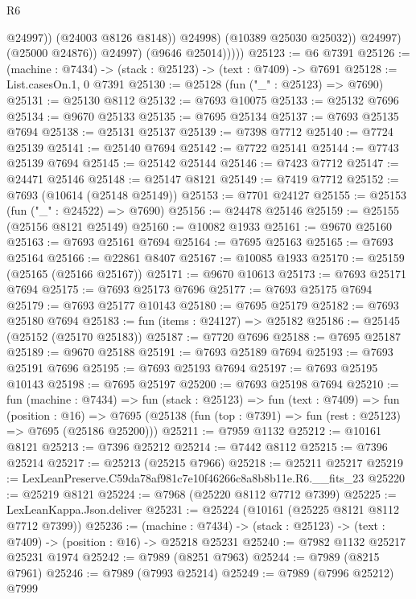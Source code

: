 \begin{lexlean}{R6}
\begin{coremodule}
                            @24997))
                        (@24003 @8126 @8148))
                      @24998)
                    (@10389 @25030 @25032))
                  @24997)
                (@25000 @24876))
              @24997)
            (@9646 @25014)))))
@25123 := @6 @7391
@25126 := (machine : @7434) -> (stack : @25123) -> (text : @7409) -> @7691
@25128 := List.casesOn.{1, 0} @7391
@25130 := @25128 (fun ("_" : @25123) => @7690)
@25131 := @25130 @8112
@25132 := @7693 @10075
@25133 := @25132 @7696
@25134 := @9670 @25133
@25135 := @7695 @25134
@25137 := @7693 @25135 @7694
@25138 := @25131 @25137
@25139 := @7398 @7712
@25140 := @7724 @25139
@25141 := @25140 @7694
@25142 := @7722 @25141
@25144 := @7743 @25139 @7694
@25145 := @25142 @25144
@25146 := @7423 @7712
@25147 := @24471 @25146
@25148 := @25147 @8121
@25149 := @7419 @7712
@25152 := @7693 (@10614 (@25148 @25149))
@25153 := @7701 @24127
@25155 := @25153 (fun ("_" : @24522) => @7690)
@25156 := @24478 @25146
@25159 := @25155 (@25156 @8121 @25149)
@25160 := @10082 @1933
@25161 := @9670 @25160
@25163 := @7693 @25161 @7694
@25164 := @7695 @25163
@25165 := @7693 @25164
@25166 := @22861 @8407
@25167 := @10085 @1933
@25170 := @25159 (@25165 (@25166 @25167))
@25171 := @9670 @10613
@25173 := @7693 @25171 @7694
@25175 := @7693 @25173 @7696
@25177 := @7693 @25175 @7694
@25179 := @7693 @25177 @10143
@25180 := @7695 @25179
@25182 := @7693 @25180 @7694
@25183 := fun (items : @24127) => @25182
@25186 := @25145 (@25152 (@25170 @25183))
@25187 := @7720 @7696
@25188 := @7695 @25187
@25189 := @9670 @25188
@25191 := @7693 @25189 @7694
@25193 := @7693 @25191 @7696
@25195 := @7693 @25193 @7694
@25197 := @7693 @25195 @10143
@25198 := @7695 @25197
@25200 := @7693 @25198 @7694
@25210 := fun (machine : @7434) =>
  fun (stack : @25123) =>
  fun (text : @7409) =>
  fun (position : @16) =>
  @7695 (@25138 (fun (top : @7391) => fun (rest : @25123) => @7695 (@25186 @25200)))
@25211 := @7959 @1132
@25212 := @10161 @8121
@25213 := @7396 @25212
@25214 := @7442 @8112
@25215 := @7396 @25214
@25217 := @25213 (@25215 @7966)
@25218 := @25211 @25217
@25219 := LexLeanPreserve.C59da78af981c7e10f46266c8a8b8b11e.R6.__fits_23
@25220 := @25219 @8121
@25224 := @7968 (@25220 @8112 @7712 @7399)
@25225 := LexLeanKappa.Json.deliver
@25231 := @25224 (@10161 (@25225 @8121 @8112 @7712 @7399))
@25236 := (machine : @7434) ->
  (stack : @25123) -> (text : @7409) -> (position : @16) -> @25218 @25231
@25240 := @7982 @1132 @25217 @25231 @1974
@25242 := @7989 (@8251 @7963)
@25244 := @7989 (@8215 @7961)
@25246 := @7989 (@7993 @25214)
@25249 := @7989 (@7996 @25212) @7999

\end{coremodule}
\end{lexlean}
